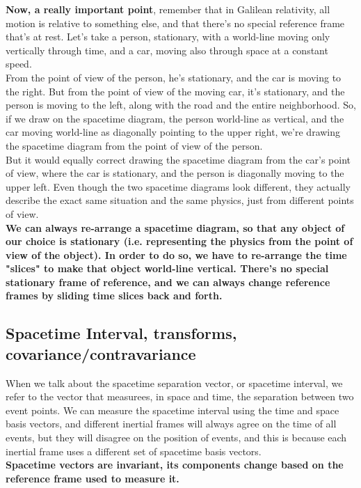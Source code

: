 \textbf{Now, a really important point}, remember that in Galilean relativity, all motion is relative to something else, and that there's no
special reference frame that's at rest. Let's take a person, stationary, with a world-line moving only vertically through time, and a car, moving 
also through space at a constant speed.\\
From the point of view of the person, he's stationary, and the car is moving to the right. But from the point of view of the moving car, it's stationary, and the person is moving
to the left, along with the road and the entire neighborhood.
So, if we draw on the spacetime diagram, the person world-line as vertical, and the car moving world-line as diagonally pointing to the upper right, we're
drawing the spacetime diagram from the point of view of the person.\\
But it would equally correct drawing the spacetime diagram from the car's point of view, where the car is stationary, and the person is diagonally moving to the upper left.
Even though the two spacetime diagrams look different, they actually describe the exact same situation and the same physics, just from different points of view.\\

\textbf{We can always re-arrange a spacetime diagram, so that any object of our choice is stationary (i.e. representing the physics from the point of view of the object).
In order to do so, we have to re-arrange the time "slices" to make that object world-line vertical.
There's no special stationary frame of reference, and we can always change reference frames by sliding time slices back and forth.}

\subsection{Spacetime Interval, transforms, covariance/contravariance}

When we talk about the spacetime separation vector, or spacetime interval, we refer to the vector that measurees, in space and time, the separation between two event points.
We can measure the spacetime interval using the time and space basis vectors, and different inertial frames will always agree on the time of all events, but they will disagree on 
the position of events, and this is because each inertial frame uses a different set of spacetime basis vectors.\\
\textbf{Spacetime vectors are invariant, its components change based on the reference frame used to measure it.}

